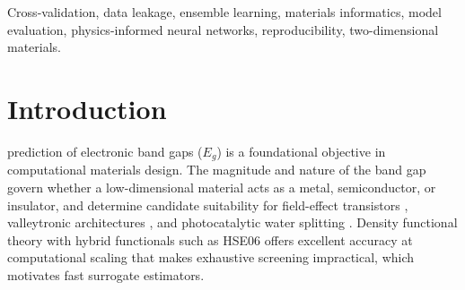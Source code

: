 \documentclass{ieeeaccess}
\begin{document}
\begin{abstract}
Hybrid architectures that correct a gradient-boosted prior with a neural residual head are widely reported to improve tabular property prediction in materials informatics. Evaluating one such architecture for band gaps of two-dimensional materials under a protocol that closes six leakage pathways, we find that its reported advantage does not survive: it fails to improve on the prior it corrects ($R^2 = 0.810 \pm 0.047$ against $0.823 \pm 0.043$; superior on 12 of 25 fold estimates; $p = 0.54$), and none of its physics-motivated components contributes measurably. A component ablation traces the discrepancy to a single implementation detail: constructing the tree prior in sample rather than out of fold lifts the same architecture above its baseline on 21 of 25 fold estimates, manufacturing the reported improvement with every other component held fixed. What does work on the same 1{,}169 rectangular-lattice C2DB materials is heterogeneous stacking: an ensemble of five base learners is the strongest configuration tested ($R^2 = 0.877 \pm 0.038$, MAE $0.363$ eV), beating the gradient-boosting baseline on 8 of 8 independent held-out sets ($p = 0.002$). Because its margin over the best single model is small, we justify it on decision-relevant grounds: the best single model is unstable across folds, the ensemble beats a committed choice on 22 of 25 folds, and it cuts predictions in error by more than 1 eV from 7.4\% to 6.3\% for under nine seconds of training. Removing every DFT-derived descriptor costs $0.044$ in $R^2$.
\end{abstract}

\begin{keywords}
Cross-validation, data leakage, ensemble learning, materials informatics, model evaluation, physics-informed neural networks, reproducibility, two-dimensional materials.
\end{keywords}

\titlepgskip=-21pt

\maketitle

\section{Introduction}
\label{sec:introduction}
 prediction of electronic band gaps ($E_g$) is a foundational objective in computational materials design. The magnitude and nature of the band gap govern whether a low-dimensional material acts as a metal, semiconductor, or insulator, and determine candidate suitability for field-effect transistors \cite{fiori2014electronics}, valleytronic architectures \cite{schaibley2016valleytronics,xiao2012coupled}, and photocatalytic water splitting \cite{singh2015computational}. Density functional theory with hybrid functionals such as HSE06 \cite{heyd2003hybrid} offers excellent accuracy at computational scaling that makes exhaustive screening impractical, which motivates fast surrogate estimators.
\end{document}
